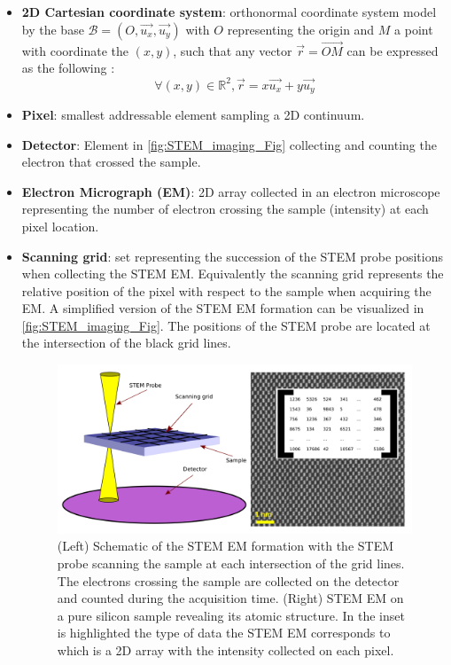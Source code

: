 \documentclass[12pt]{article}
\begin{document}
\begin{itemize}

\item \textbf{2D Cartesian coordinate system}: orthonormal coordinate system model by the base $\mathcal{B}=(O,\vec{u_x},\vec{u_y})$ with $O$ representing the origin and $M$ a point with coordinate the $(x,y)$, such that any vector $\vec{r}=\overrightarrow{\mathit{OM}}$ can be expressed as the following :
\begin{equation}
\forall (x,y) \in \mathbb{R}^{2}, \vec{r}=x\vec{u_x}+y\vec{u_y}
\end{equation}
\item \textbf{Pixel}: smallest addressable element sampling a 2D continuum.
\item \textbf{Detector}: Element in \cref{fig:STEM_imaging_Fig} collecting and counting the electron that crossed the sample.
\item \textbf{Electron Micrograph (EM)}: 2D array collected in an electron microscope representing the number of electron crossing the sample (intensity) at each pixel location.
\item \textbf{Scanning grid}: set representing the succession of the STEM probe positions when collecting the STEM EM. Equivalently the scanning grid represents the relative position of the pixel with respect to the sample when acquiring the EM. A simplified version of the 
STEM EM formation can be visualized in \cref{fig:STEM_imaging_Fig}. The positions of the STEM probe are located at the intersection of the black grid lines.
\begin{figure}[H]
\begin{center}
\includegraphics[scale=0.7]{Figures/STEM_imaging_Fig.png}
\caption{(Left) Schematic of the STEM EM formation with the STEM probe scanning the sample at each intersection of the grid lines. The electrons crossing the sample are collected on the detector and counted during the acquisition time. (Right) STEM EM on a pure silicon sample revealing its atomic structure. In the inset is highlighted the type of data the STEM EM corresponds to which is a 2D array with the intensity collected on each pixel.}

\end{center}
\end{figure}
\end{itemize}
\end{document}
